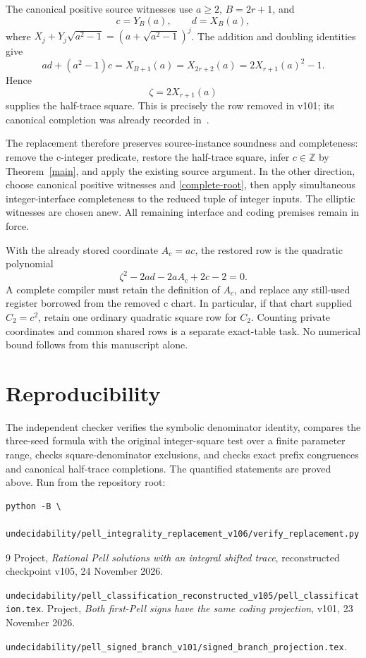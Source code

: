 \documentclass[11pt]{article}
\newcommand{\Z}{\mathbb Z}\newcommand{\Q}{\mathbb Q}
\begin{document}
The canonical positive source witnesses use \(a\ge2\),
\(B=2r+1\), and
\[
                     c=Y_B(a),\qquad d=X_B(a),
\]
where \(X_j+Y_j\sqrt{a^2-1}=(a+\sqrt{a^2-1})^j\).
The addition and doubling identities give
\[
 ad+(a^2-1)c=X_{B+1}(a)=X_{2r+2}(a)
                         =2X_{r+1}(a)^2-1.
\]
Hence
\begin{equation}\label{complete-root}
                            \zeta=2X_{r+1}(a)
\end{equation}
supplies the half-trace square. This is precisely the row removed in
v101; its canonical completion was already recorded
in~\cite[Section 6]{Signed}.

The replacement therefore preserves source-instance soundness and
completeness: remove the c-integer predicate, restore the half-trace
square, infer \(c\in\Z\) by Theorem~\ref{main}, and apply the
existing source argument. In the other direction, choose canonical
positive witnesses and \eqref{complete-root}, then apply simultaneous
integer-interface completeness to the reduced tuple of integer inputs.
The elliptic witnesses are chosen anew. All remaining interface and
coding premises remain in force.

With the already stored coordinate \(A_c=ac\), the restored row is
the quadratic polynomial
\[
                    \zeta^2-2ad-2aA_c+2c-2=0.
\]
A complete compiler must retain the definition of \(A_c\), and
replace any still-used register borrowed from the removed c chart.
In particular, if that chart supplied \(C_2=c^2\), retain one
ordinary quadratic square row for \(C_2\). Counting private
coordinates and common shared rows is a separate exact-table task.
No numerical bound follows from this manuscript alone.

\section{Reproducibility}

The independent checker verifies the symbolic denominator identity,
compares the three-seed formula with the original integer-square test
over a finite parameter range, checks square-denominator exclusions,
and checks exact prefix congruences and canonical half-trace completions.
The quantified statements are proved above. Run from the repository root:
{\small\begin{verbatim}
python -B \
  undecidability/pell_integrality_replacement_v106/verify_replacement.py
\end{verbatim}}

\begin{thebibliography}{9}
\small
{} Project, \emph{Rational Pell solutions with
an integral shifted trace}, reconstructed checkpoint v105,
24 November 2026.\par
\nolinkurl{undecidability/pell_classification_reconstructed_v105/pell_classification.tex}.
\bibitem{Signed} Project, \emph{Both first-Pell signs have the same
coding projection}, v101, 23 November 2026.\par
\nolinkurl{undecidability/pell_signed_branch_v101/signed_branch_projection.tex}.
\end{thebibliography}
\end{document}
